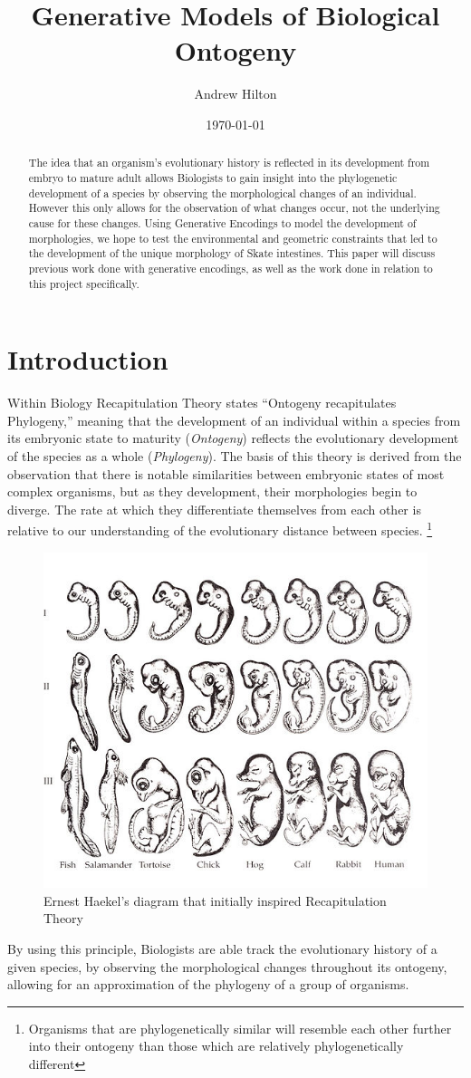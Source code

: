 \documentclass[condensed]{union-cs-thesis}
\begin{document}
\title{Generative Models of Biological Ontogeny}
\author{Andrew Hilton}
\date{\today}
\maketitle


\begin{abstract}
  \makeabstract
  The idea that an organism's evolutionary history is reflected in its development from embryo to mature adult allows Biologists to gain insight into the phylogenetic development of a species by observing the morphological changes of an individual.  However this only allows for the observation of what changes occur, not the underlying cause for these changes.  Using Generative Encodings to model the development of morphologies, we hope to test the environmental and geometric constraints that led to the development of the unique morphology of Skate intestines.  This paper will discuss previous work done with generative encodings, as well as the work done in relation to this project specifically.
\end{abstract}


\section{Introduction}

\par
Within Biology Recapitulation Theory states ``Ontogeny recapitulates Phylogeny,'' meaning that the development of an individual within a species from its embryonic state to maturity (\emph{Ontogeny}) reflects the evolutionary development of the species as a whole (\emph{Phylogeny}).  The basis of this theory is derived from the observation that there is notable similarities between embryonic states of most complex organisms, but as they development, their morphologies begin to diverge.  The rate at which they differentiate themselves from each other is relative to our understanding of the evolutionary distance between species.
\footnote{Organisms that are phylogenetically similar will resemble each other further into their ontogeny than those which are relatively phylogenetically different}
\begin{figure}[h]
  \centering
  \includegraphics[width=.25\textwidth]{recapitulation}
  \caption{Ernest Haekel's diagram that initially inspired Recapitulation Theory}
  \label{fig:recapitulation_diagram}
\end{figure}
By using this principle, Biologists are able track the evolutionary history of a given species, by observing the morphological changes throughout its ontogeny, allowing for an approximation of the phylogeny of a group of organisms.
\end{document}
